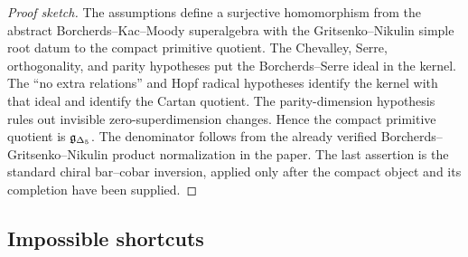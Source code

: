 \begin{proof}[Proof sketch]
The assumptions define a surjective homomorphism from the abstract
Borcherds--Kac--Moody superalgebra with the Gritsenko--Nikulin simple root
datum to the compact primitive quotient.  The Chevalley, Serre, orthogonality,
and parity hypotheses put the Borcherds--Serre ideal in the kernel.  The
``no extra relations'' and Hopf radical hypotheses identify the kernel with
that ideal and identify the Cartan quotient.  The parity-dimension hypothesis
rules out invisible zero-superdimension changes.  Hence the compact primitive
quotient is \(\mathfrak g_{\Delta_{5}}\).  The denominator follows from the already verified
Borcherds--Gritsenko--Nikulin product normalization in the paper.  The last
assertion is the standard chiral bar--cobar inversion, applied only after the
compact object and its completion have been supplied.
\end{proof}

\subsection{Impossible shortcuts}

